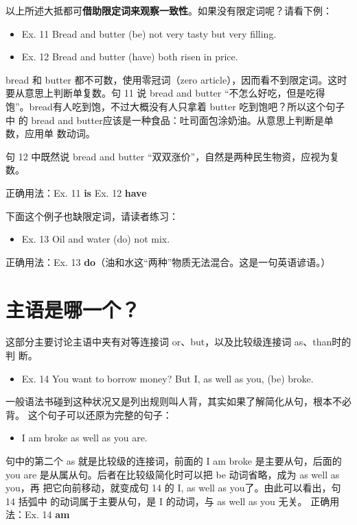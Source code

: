 以上所述大抵都可\textbf{借助限定词来观察一致性}。如果没有限定词呢？请看下例：
\begin{mybox}
  \begin{itemize}
  \item   Ex. 11 Bread and butter (be) not very tasty but very filling.
  \item   Ex. 12 Bread and butter (have) both risen in price.
  \end{itemize}

  bread 和 butter 都不可数，使用零冠词（zero article），因而看不到限定词。这时
  要从意思上判断单复数。句 11 说 bread and butter “不怎么好吃，但是吃得
  饱”。bread有人吃到饱，不过大概没有人只拿着 butter 吃到饱吧？所以这个句子中
  的 bread and butter应该是一种食品：吐司面包涂奶油。从意思上判断是单数，应用单
  数动词。

  句 12 中既然说 bread and butter “双双涨价”，自然是两种民生物资，应视为复
  数。

  \tcblower

  正确用法：Ex. 11 \textbf{is} \qquad\quad Ex. 12 \textbf{have}
\end{mybox}

下面这个例子也缺限定词，请读者练习：
\begin{mybox}
  \begin{itemize}
  \item   Ex. 13 Oil and water (do) not mix.
  \end{itemize}
  \tcblower
  正确用法：Ex. 13 \textbf{do}（油和水这“两种”物质无法混合。这是一句英语谚语。）
\end{mybox}

\section{主语是哪一个？}

这部分主要讨论主语中夹有对等连接词 or、but，以及比较级连接词 as、than时的判
断。
\begin{mybox}
  \begin{itemize}
  \item   Ex. 14 You want to borrow money? But I, as well as you, (be) broke.
  \end{itemize}
  一般语法书碰到这种状况又是列出规则叫人背，其实如果了解简化从句，根本不必背。
  这个句子可以还原为完整的句子：
  \begin{itemize}
  \item   I am broke as well as you are.
  \end{itemize}
  句中的第二个 as 就是比较级的连接词，前面的 I am broke 是主要从句，后面的you
  are 是从属从句。后者在比较级简化时可以把 be 动词省略，成为 as well as you，再
  把它向前移动，就变成句 14 的 I, as well as you了。由此可以看出，句 14 括弧中
  的动词属于主要从句，是 I 的动词，与 as well as you 无关。
  \tcblower
  正确用法：Ex. 14 \textbf{am}
\end{mybox}

